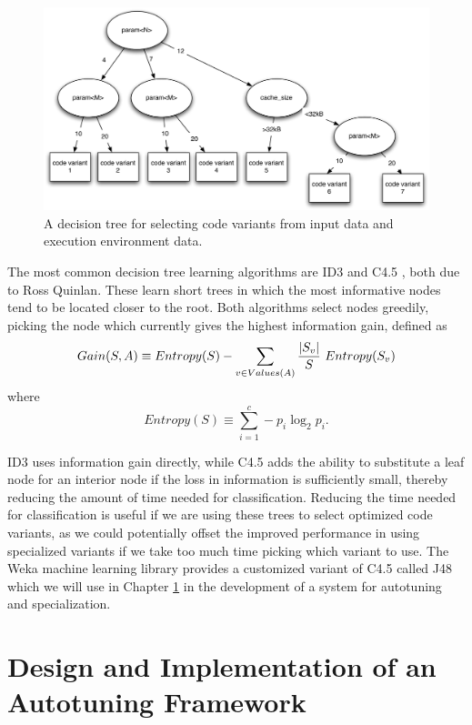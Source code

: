 \documentclass[msthesis,justified,copyright,final,numbers,sort&compress,
gsmodern,amstex,natbib]{uothesis}
\begin{document}
\begin{figure}[tbp]
\centering
\includegraphics[width=\textwidth]{dectree.pdf}
\caption{A decision tree for selecting code variants from input data and execution environment data.}
\label{fig:dectree}
\end{figure}

The most common decision tree learning algorithms are ID3 \cite{id3} and C4.5 \cite{c45}, both due to Ross Quinlan. These learn short trees in which the most informative nodes tend to be located closer to the root. Both algorithms select nodes greedily, picking the node which currently gives the highest information gain, defined as $$Gain(S,A) \equiv Entropy(S) - \sum\limits_{v \in Values(A)} {{\left|S_v\right|}\over{S}}\ Entropy(S_v)$$ where $$Entropy(S) \equiv \sum\limits_{i=1}^c -p_i\log_2 p_i\mathrm{.}$$

ID3 uses information gain directly, while C4.5 adds the ability to substitute a leaf node for an interior node if the loss in information is sufficiently small, thereby reducing the amount of time needed for classification. Reducing the time needed for classification is useful if we are using these trees to select optimized code variants, as we could potentially offset the improved performance in using specialized variants if we take too much time picking which variant to use. The Weka machine learning library \cite{weka} provides a customized variant of C4.5 called J48 which we will use in Chapter \ref{design} in the development of a system for autotuning and specialization.



\chapter{Design and Implementation of an Autotuning Framework}
\label{design}
\end{document}
